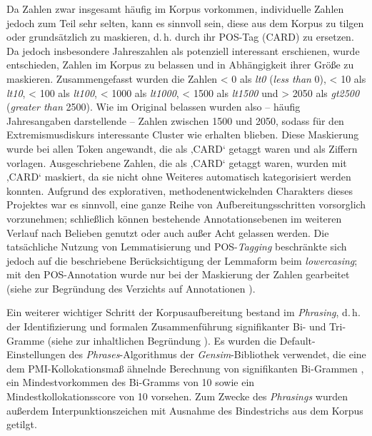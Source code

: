 Da Zahlen zwar insgesamt häufig im Korpus vorkommen, individuelle Zahlen jedoch zum Teil sehr selten, kann es sinnvoll sein, diese aus dem Korpus zu tilgen oder grundsätzlich zu maskieren, d.\,h. durch ihr POS-Tag (CARD) zu ersetzen. Da jedoch insbesondere Jahreszahlen als potenziell interessant erschienen, wurde entschieden, Zahlen im Korpus zu belassen und in Abhängigkeit ihrer Größe zu maskieren. Zusammengefasst wurden die Zahlen \textless{} 0 als \emph{lt0} (\emph{less than} 0), \textless{} 10 als \emph{lt10}, \textless{} 100 als \emph{lt100}, \textless{} 1000 als \emph{lt1000}, \textless{} 1500 als \emph{lt1500} und \textgreater{} 2050 als \emph{gt2500} (\emph{greater than} 2500). Wie im Original belassen wurden also -- häufig Jahresangaben darstellende -- Zahlen zwischen 1500 und 2050, sodass für den Extremismusdiskurs interessante Cluster wie  erhalten blieben. Diese Maskierung wurde bei allen Token angewandt, die als ‚CARD` getaggt waren und als Ziffern vorlagen. Ausgeschriebene Zahlen, die als ‚CARD` getaggt waren, wurden mit ‚CARD` maskiert, da sie nicht ohne Weiteres automatisch kategorisiert werden konnten. Aufgrund des explorativen, methodenentwickelnden Charakters dieses Projektes war es sinnvoll, eine ganze Reihe von Aufbereitungsschritten vorsorglich vorzunehmen; schließlich können bestehende Annotationsebenen im weiteren Verlauf nach Belieben genutzt oder auch außer Acht gelassen werden. Die tatsächliche Nutzung von Lemmatisierung und POS-\emph{Tagging} beschränkte sich jedoch auf die beschriebene Berücksichtigung der Lemmaform beim \emph{lowercasing}; mit den POS-Annotation wurde nur bei der Maskierung der Zahlen gearbeitet (siehe zur Begründung des Verzichts auf Annotationen ).

Ein weiterer wichtiger Schritt der Korpusaufbereitung bestand im \emph{Phrasing}, d.\,h. der Identifizierung und formalen Zusammenführung signifikanter Bi- und Tri-Gramme (siehe zur inhaltlichen Begründung ). Es wurden die Default-Einstellungen des \emph{Phrases}-Algorithmus der \emph{Gensim}-Bibliothek verwendet, die eine dem PMI-Kollokationsmaß ähnelnde Berechnung von signifikanten Bi-Grammen \autocite{mikolovDistributedRepresentationsWords2013}, ein Mindestvorkommen des Bi-Gramms von 10 sowie ein Mindestkollokationsscore von 10 vorsehen. Zum Zwecke des \emph{Phrasings} wurden außerdem Interpunktionszeichen mit Ausnahme des Bindestrichs aus dem Korpus getilgt.

